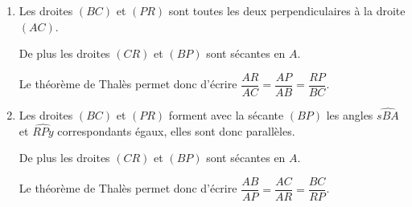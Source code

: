 \begin{corrige}
    \begin{enumerate}
        \item Les droites $(BC)$ et $(PR)$ sont toutes les deux perpendiculaires à la droite $(AC)$.
        
        De plus les droites $(CR)$ et $(BP)$ sont sécantes en $A$.

        \medskip
        Le théorème de Thalès permet donc d'écrire $\dfrac{AR}{AC}=\dfrac{AP}{AB}=\dfrac{RP}{BC}$.

        \medskip
        \item Les droites $(BC)$ et $(PR)$ forment avec la sécante $(BP)$
        les angles  $\widehat{sBA}$ et $\widehat{RPy}$ correspondants égaux, elles sont donc parallèles.
        
        De plus les droites $(CR)$ et $(BP)$ sont sécantes en $A$.

        \medskip
        Le théorème de Thalès permet donc d'écrire $\dfrac{AB}{AP}=\dfrac{AC}{AR}=\dfrac{BC}{RP}$.

    \end{enumerate}

\end{corrige}

